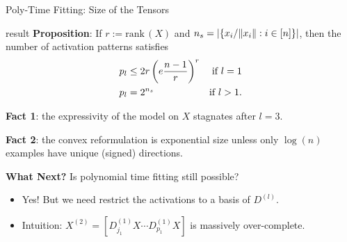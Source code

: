 \documentclass[usenames,dvipsnames,notheorems]{beamer}
\newcommand{\bad}[1]{\textcolor{bad}{#1}}
\newcommand{\good}[1]{\textcolor{good}{#1}}
\begin{document}
\begin{frame}{Poly-Time Fitting: Size of the Tensors}
	\begin{beamercolorbox}[wd=\textwidth,sep=1em]{result}
		\textbf{Proposition}: If \( r := \text{rank}\,(X) \) and
		\( n_s = \left\vert \left\{x_i / \|x_i\| : i \in [n]\right\}\right\vert \), then
		the number of activation patterns satisfies
		\begin{equation*}\label{eq:activation-pattern-bound}
			\begin{aligned}
				p_l & \leq 2 r \left(e \frac{n - 1}{r}\right)^{r} & \mbox{if \( l = 1 \)}  \\
				p_l & = 2^{n_{s}}                          & \mbox{if \( l > 1 \)}.
			\end{aligned}
		\end{equation*}
		\vspace{-1ex}
	\end{beamercolorbox}

	\pause
	\vspace{1ex}

	\textbf{Fact 1}: the expressivity of the model on \( X \) stagnates
	after \( l = 3 \).

	\pause
	\vspace{1ex}

	\textbf{Fact 2}: the convex reformulation is \bad{exponential
		size} unless only \( \log(n) \) examples have unique (signed) directions.

	\pause
	\vspace{1ex}

	\textbf{What Next?} Is polynomial time fitting still possible?

	\pause
	\vspace{1ex}

	\begin{itemize}
		\item[$\longrightarrow$] \good{Yes!} But we need restrict the
		      activations to a basis of \( D^{(l)} \).
		      \pause
		      \vspace{0.5ex}
		\item[$\longrightarrow$] Intuition:
		      \( X^{(2)} = [D^{(1)}_{j_1} X \cdots D^{(1)}_{p_1} X] \)
		      is \good{massively over-complete}.
	\end{itemize}

\end{frame}
\end{document}
